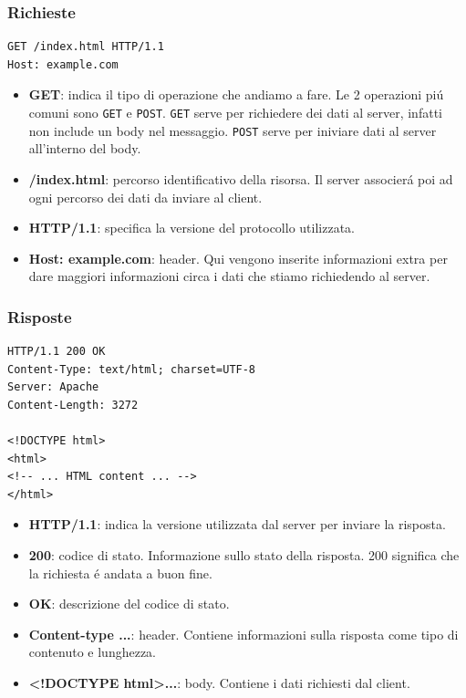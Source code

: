 \subsubsection{Richieste}
\begin{verbatim}
GET /index.html HTTP/1.1
Host: example.com
\end{verbatim}
\begin{itemize}[label={}]
  \item \textbf{GET}: indica il tipo di operazione che andiamo a fare. Le 2 operazioni piú comuni sono \texttt{GET} e \texttt{POST}. \texttt{GET} serve per richiedere dei dati al server, infatti non include un body nel messaggio. \texttt{POST} serve per iniviare dati al server all'interno del body.
  \item \textbf{/index.html}: percorso identificativo della risorsa. Il server associerá poi ad ogni percorso dei dati da inviare al client.
  \item \textbf{HTTP/1.1}: specifica la versione del protocollo utilizzata.
  \item \textbf{Host: example.com}: header. Qui vengono inserite informazioni extra per dare maggiori informazioni circa i dati che stiamo richiedendo al server.
\end{itemize}

\subsubsection{Risposte}
\begin{verbatim}
HTTP/1.1 200 OK
Content-Type: text/html; charset=UTF-8
Server: Apache
Content-Length: 3272

<!DOCTYPE html>
<html>
<!-- ... HTML content ... -->
</html>
\end{verbatim}
\begin{itemize}[label={}]
  \item \textbf{HTTP/1.1}: indica la versione utilizzata dal server per inviare la risposta.
  \item \textbf{200}: codice di stato. Informazione sullo stato della risposta. 200 significa che la richiesta é andata a buon fine.
  \item \textbf{OK}: descrizione del codice di stato.
  \item \textbf{Content-type ...}: header. Contiene informazioni sulla risposta come tipo di contenuto e lunghezza.
  \item \textbf{\textless!DOCTYPE html\textgreater ...}: body. Contiene i dati richiesti dal client.
\end{itemize}

